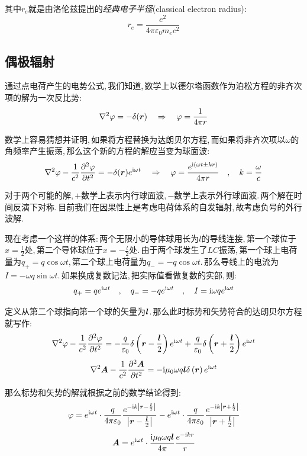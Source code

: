 其中$r_e$就是由洛伦兹提出的\emph{经典电子半径}(classical electron radius):
\[r_e=\frac{e^2}{4\pi\varepsilon_0m_e c^2}\]




\subsection{偶极辐射}

通过点电荷产生的电势公式,\,我们知道,\,数学上以德尔塔函数作为泊松方程的非齐次项的解为一次反比势:
\[\nabla^2\varphi =-\delta (\boldsymbol{r})\quad \Rightarrow \quad \varphi =\frac{1}{4\pi r}\]

数学上容易猜想并证明,\,如果将方程替换为达朗贝尔方程,\,而如果将非齐次项以$\omega$的角频率产生振荡,\,那么这个新的方程的解应当变为球面波:
\[\nabla^2\varphi -\frac{1}{c^2}\frac{\partial^2 \varphi}{\partial t^2}=-\delta (\boldsymbol{r})e^{{\rm i} \omega t}\quad \Rightarrow \quad \varphi =\frac{e^{{\rm i}(\omega t\pm kr)}}{4\pi r}\quad ,\quad k=\frac{\omega}{c}\]

对于两个可能的解,\,$+$数学上表示内行球面波,\,$-$数学上表示外行球面波.\,两个解在时间反演下对称.\,目前我们在因果性上是考虑电荷体系的自发辐射,\,故考虑负号的外行波解.

现在考虑一个这样的体系:\,两个无限小的导体球用长为$l$的导线连接,\,第一个球位于$x=\frac{l}{2}$处,\,第二个导体球位于$x=-\frac{l}{2}$处.\,由于两个球发生了$LC$振荡,\,第一个球上电荷量为$q_+=q\cos\omega t$,\,第二个球上电荷量为$q_-=-q\cos\omega t$.\,那么导线上的电流为$I=-\omega q\sin\omega t$.\,如果换成复数记法,\,把实际值看做复数的实部,\,则:
\[q_+=qe^{{\rm i}\omega t}\quad ,\quad q_-=-qe^{{\rm i}\omega t} \quad ,\quad I={\rm i}\omega qe^{{\rm i}\omega t}\]

定义从第二个球指向第一个球的矢量为$\boldsymbol{l}$.\,那么此时标势和矢势符合的达朗贝尔方程就写作:
\[\nabla^2\varphi -\frac{1}{c^2}\frac{\partial^2 \varphi}{\partial t^2}=-\frac{q}{\varepsilon_0}\delta \left(\boldsymbol{r}-\frac{\boldsymbol{l}}{2}\right)e^{{\rm i} \omega t}+\frac{q}{\varepsilon_0}\delta \left(\boldsymbol{r}+\frac{\boldsymbol{l}}{2}\right)e^{{\rm i} \omega t}\]
\[\nabla^2\boldsymbol{A} -\frac{1}{c^2}\frac{\partial^2 \boldsymbol{A}}{\partial t^2}=-{\rm i}\mu_0\omega q\boldsymbol{l}\delta \left(\boldsymbol{r}\right)e^{{\rm i} \omega t}\]

那么标势和矢势的解就根据之前的数学结论得到:
\[\varphi=e^{{\rm i}\omega t}\cdot\frac{q}{4\pi\varepsilon_0} \frac{e^{- {\rm i} k\left|\boldsymbol{r}-\frac{\boldsymbol{l}}{2}\right|}}{\left|\boldsymbol{r}-\frac{\boldsymbol{l}}{2}\right|}-e^{{\rm i}\omega t}\cdot\frac{q}{4\pi\varepsilon_0} \frac{e^{- {\rm i} k\left|\boldsymbol{r}+\frac{\boldsymbol{l}}{2}\right|}}{\left|\boldsymbol{r}+\frac{\boldsymbol{l}}{2}\right|}\]
\[\boldsymbol{A}=e^{{\rm i}\omega t}\cdot\frac{{\rm i}\mu_0\omega q\boldsymbol{l}}{4\pi} \frac{e^{- {\rm i} kr}}{r}\]

